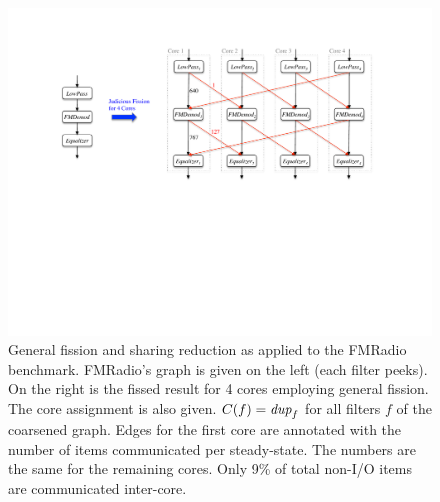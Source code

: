 \documentclass[]{article}
\newcommand{\mt}[1]{\mbox{\it #1}}
\begin{document}
\begin{figure}
\centering
\includegraphics[width=\textwidth]{fm-4.pdf}
\caption[Judicious General Fission for FMRadio.]  { General
  fission and sharing reduction as applied to the FMRadio benchmark.  FMRadio's 
  graph is given on the left (each filter peeks).  On the right is the fissed
  result for 4 cores employing general fission. The core assignment is
  also given.  $C(f) = \mt{dup}_f$ for all filters $f$ of the
  coarsened graph.  Edges for the first core are annotated with the number
  of items communicated per steady-state.  The numbers are the same
  for the remaining cores.  Only 9\% of total non-I/O items are 
  communicated inter-core.\label{fig:fm-gen-comm}}
\end{figure}
\end{document}
